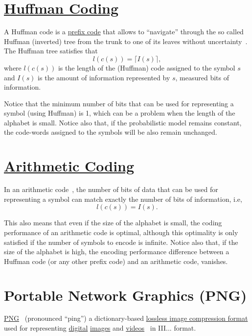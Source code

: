 \section{\href{https://en.wikipedia.org/wiki/Huffman_coding}{Huffman Coding}}

A Huffman code is a
\href{https://en.wikipedia.org/wiki/Prefix_code}{prefix code} that
allows to ``navigate'' through the so called Huffman (inverted) tree
from the trunk to one of its leaves without
uncertainty~\cite{vruiz__huffman_coding}. The Huffman tree satisfies that
\begin{equation}
  l(c(s)) = \lceil I(s)\rceil,
  \label{eq:huffman_performance}
\end{equation}
where $l(c(s))$ is the length of the (Huffman) code assigned to the
symbol $s$ and $I(s)$ is the amount of information represented by $s$,
measured bits of information.

Notice that the minimum number of bits that can be used for
representing a symbol (using Huffman) is 1, which can be a problem
when the length of the alphabet is small. Notice also that, if the
probabilistic model remains constant, the code-words assigned to the
symbols will be also remain unchanged.

\section{\href{https://en.wikipedia.org/wiki/Arithmetic_coding}{Arithmetic Coding}}

In an arithmetic code~\cite{vruiz__arithmetic_coding}, the number of
bits of data that can be used for representing a symbol can match
exactly the number of bits of information, i.e,
\begin{equation}
  l(c(s)) = I(s).
\end{equation}

This also means that even if the size of the alphabet is small, the
coding performance of an arithmetic code is optimal, although this
optimality is only satisfied if the number of symbols to encode is
infinite. Notice also that, if the size of the alphabet is high, the
encoding performance difference between a Huffman code (or any other
prefix code) and an arithmetic code, vanishes.

\section{Portable Network Graphics (PNG)}

\href{https://en.wikipedia.org/wiki/Portable_Network_Graphics}{PNG}~\cite{vruiz__PNG}
(pronounced ``ping'') a dictionary-based
\href{https://en.wikipedia.org/wiki/Lossless_compression}{lossless
  image compression format} used for representing
\href{https://en.wikipedia.org/wiki/Digital_data}{digital}
\href{https://en.wikipedia.org/wiki/Digital_image}{images} and
\href{https://en.wikipedia.org/wiki/Video}{videos}~\cite{vruiz__image_video}
in III... format.


